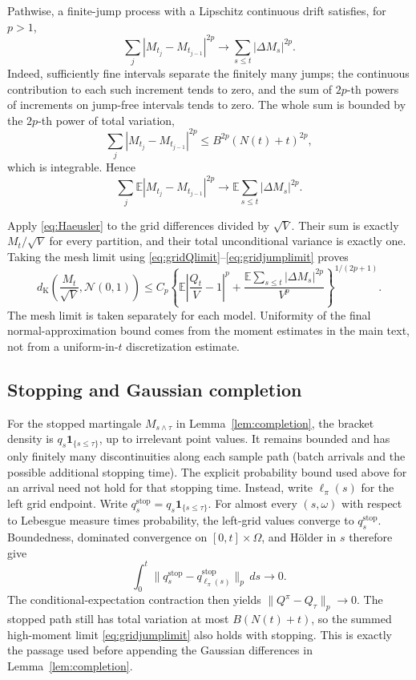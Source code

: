 \documentclass[11pt]{article}
\numberwithin{equation}{section}
\theoremstyle{definition}
\theoremstyle{remark}
\newcommand{\E}{\mathbb E}
\newcommand{\ind}{\mathbf 1}
\newcommand{\dK}{d_{\mathrm K}}
\newcommand{\Normal}{\mathcal N(0,1)}
\begin{document}
Pathwise, a finite-jump process with a Lipschitz continuous drift satisfies,
for $p>1$,
\[
 \sum_j|M_{t_j}-M_{t_{j-1}}|^{2p}
 \longrightarrow\sum_{s\le t}|\Delta M_s|^{2p}.
\]
Indeed, sufficiently fine intervals separate the finitely many jumps; the
continuous contribution to each such increment tends to zero, and the sum of
$2p$-th powers of increments on jump-free intervals tends to zero. The whole
sum is bounded by the $2p$-th power of total variation,
\[
 \sum_j|M_{t_j}-M_{t_{j-1}}|^{2p}
 \le B^{2p}(N(t)+t)^{2p},
\]
which is integrable. Hence
\begin{equation}\label{eq:gridjumplimit}
 \sum_j\E|M_{t_j}-M_{t_{j-1}}|^{2p}
 \longrightarrow\E\sum_{s\le t}|\Delta M_s|^{2p}.
\end{equation}

Apply \eqref{eq:Haeusler} to the grid differences divided by $\sqrt V$.
Their sum is exactly $M_t/\sqrt V$ for every partition, and their total
unconditional variance is exactly one. Taking the mesh limit using
\eqref{eq:gridQlimit}--\eqref{eq:gridjumplimit} proves
\begin{equation}\label{eq:continuousHaeusler}
 \dK\left(\frac{M_t}{\sqrt V},\Normal\right)
 \le C_p\left\{
 \E\left|\frac{Q_t}{V}-1\right|^p
 +\frac{\E\sum_{s\le t}|\Delta M_s|^{2p}}{V^p}
 \right\}^{1/(2p+1)}.
\end{equation}
The mesh limit is taken separately for each model. Uniformity of the final
normal-approximation bound comes from the moment estimates in the main text,
not from a uniform-in-$t$ discretization estimate.

\subsection*{Stopping and Gaussian completion}
For the stopped martingale $M_{s\wedge\tau}$ in
Lemma~\ref{lem:completion}, the bracket density is
$q_s\ind_{\{s\le\tau\}}$, up to irrelevant point values.
It remains bounded and has only finitely many discontinuities along each
sample path (batch arrivals and the possible additional stopping time).
The explicit probability bound used above for an arrival need not hold for
that stopping time. Instead, write $\ell_\pi(s)$ for the left grid endpoint.
Write $q_s^{\mathrm{stop}}=q_s\ind_{\{s\le\tau\}}$.
For almost every $(s,\omega)$ with respect to Lebesgue measure times
probability, the left-grid values converge to $q_s^{\mathrm{stop}}$.
Boundedness, dominated convergence on $[0,t]\times\Omega$, and H\"older
in $s$ therefore give
\[
 \int_0^t\|q_s^{\mathrm{stop}}-
                   q_{\ell_\pi(s)}^{\mathrm{stop}}\|_p\,ds\to0.
\]
The conditional-expectation contraction then yields
$\|Q^\pi-Q_\tau\|_p\to0$. The stopped path still has total variation at most
$B(N(t)+t)$, so the summed high-moment limit \eqref{eq:gridjumplimit}
also holds with stopping. This is exactly the passage used before appending
the Gaussian differences in Lemma~\ref{lem:completion}.
\end{document}
